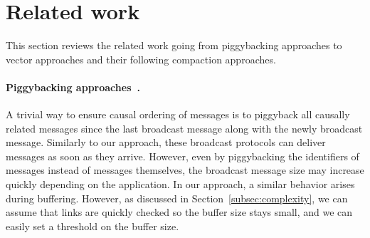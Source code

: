
\section{Related work}
\label{sec:relatedwork}

This section reviews the related work going from piggybacking approaches to
vector approaches and their following compaction approaches.

\paragraph{Piggybacking
  approaches~\cite{birman1987reliable,hadzilacos1993fault}.}
A trivial way to ensure causal ordering of messages is to piggyback all causally
related messages since the last broadcast message along with the newly broadcast
message. Similarly to our approach, these broadcast protocols can deliver
messages as soon as they arrive.  However, even by piggybacking the identifiers
of messages instead of messages themselves, the broadcast message size may
increase quickly depending on the application. In our approach, a similar
behavior arises during buffering. However, as discussed in
Section~\ref{subsec:complexity}, we can assume that links are quickly checked so
the buffer size stays small, and we can easily set a threshold on the buffer
size.

